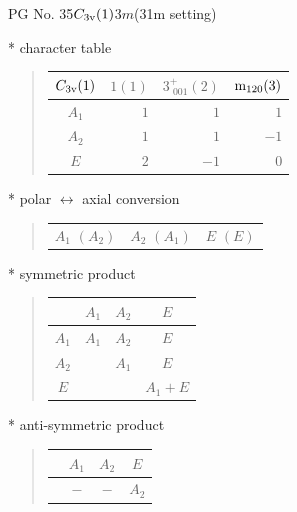 \documentclass[fleqn,8pt,landscape]{jsarticle}
\begin{document}
\setcounter{MaxMatrixCols}{32}

\renewcommand{\tablename}{Table~}
\renewcommand{\figurename}{Figure~}
\begin{center}
\LARGE
PG No. 35\quad$C_{\rm 3v}(1)$\quad$3m$\quad(31m setting)\quad[ trigonal ]
\end{center}

* character table
\begin{quote}
\begin{tabular}{crrr} \hline \hline
$ C_{\rm 3v}(1) $ & $ 1(1) $ & $ 3^{+}_{\,\,001}(2) $ & $ {\rm m}_{120}(3) $ \\ \hline
$ A_{1} $ & $ 1 $ & $ 1 $ & $ 1 $ \\
$ A_{2} $ & $ 1 $ & $ 1 $ & $ -1 $ \\
$ E $ & $ 2 $ & $ -1 $ & $ 0 $ \\
 \hline \hline
\end{tabular}
\end{quote}

* polar $\leftrightarrow$ axial conversion
\begin{quote}
\begin{tabular}{ccc}
$ A_{1}\,\,(A_{2}) $ & $ A_{2}\,\,(A_{1}) $ & $ E\,\,(E) $
\end{tabular}
\end{quote}

* symmetric product
\begin{quote}
\begin{tabular}{c|ccc} \hline \hline
 & $ A_{1} $ & $ A_{2} $ & $ E $ \\ \hline
$ A_{1} $ & $ A_{1} $ & $ A_{2} $ & $ E $ \\
$ A_{2} $ & $  $ & $ A_{1} $ & $ E $ \\
$ E $ & $  $ & $  $ & $ A_{1} + E $ \\
 \hline \hline
\end{tabular}
\end{quote}

* anti-symmetric product
\begin{quote}
\begin{tabular}{cccc} \hline \hline
 & $ A_{1} $ & $ A_{2} $ & $ E $ \\ \hline
$  $ & $ - $ & $ - $ & $ A_{2} $ \\
 \hline \hline
\end{tabular}
\end{quote}
\end{document}
